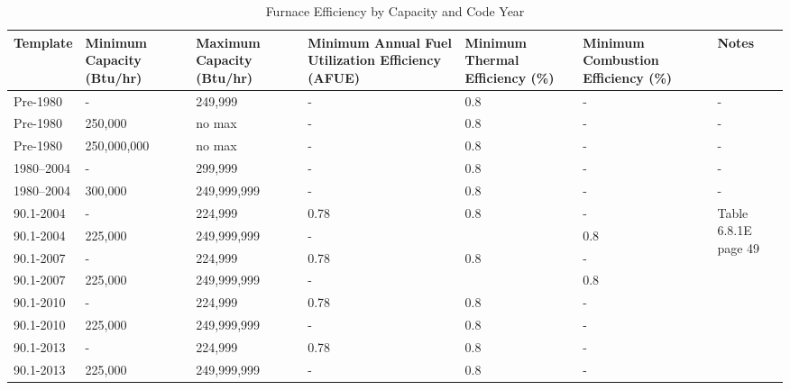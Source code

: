 \begin{table}
\centering
\scriptsize
\caption[Furnace Efficiency]{Furnace Efficiency by Capacity and Code Year}
\label{tab:furnace_eff_assignments}
\begin{tabular}{|p{0.5in}|p{0.5in}|p{0.5in}|p{0.5in}|p{0.5in}|p{0.5in}|p{1.5in}|}
\hline
\textbf{Template} &
  \textbf{Minimum   Capacity (Btu/hr)} &
  \textbf{Maximum   Capacity (Btu/hr)} &
  \textbf{Minimum   Annual Fuel Utilization Efficiency (AFUE)} &
  \textbf{Minimum   Thermal Efficiency (\%)} &
  \textbf{Minimum   Combustion Efficiency (\%)} &
  \textbf{Notes} \\ \hline
Pre-1980  & -           & 249,999       & -    & 0.8 & -   & -                                        \\ \hline
Pre-1980  & 250,000     & no max & -    & 0.8 & -   & -                                        \\ \hline
Pre-1980  & 250,000,000 & no max & -    & 0.8 & -   & -                                        \\ \hline
1980--2004 & -           & 299,999       & -    & 0.8 & -   & -                                        \\ \hline
1980--2004 & 300,000     & 249,999,999   & -    & 0.8 & -   & -                                        \\ \hline
90.1-2004           & -           & 224,999       & 0.78 & 0.8 & -   & \multirow{10}{*}{\parbox{2.5cm}{Table   6.8.1E page 49}} \\ \cline{1-6}
90.1-2004           & 225,000     & 249,999,999   & -    &     & 0.8 &                                          \\ \cline{1-6}
90.1-2007           & -           & 224,999       & 0.78 & 0.8 & -   &                                          \\ \cline{1-6}
90.1-2007           & 225,000     & 249,999,999   & -    &     & 0.8 &                                          \\ \cline{1-6}
90.1-2010           & -           & 224,999       & 0.78 & 0.8 & -   &                                          \\ \cline{1-6}
90.1-2010           & 225,000     & 249,999,999   & -    & 0.8 & -   &                                          \\ \cline{1-6}
90.1-2013           & -           & 224,999       & 0.78 & 0.8 & -   &                                          \\ \cline{1-6}
90.1-2013           & 225,000     & 249,999,999   & -    & 0.8 & -   &                                          \\ \cline{1-6}

\end{tabular}
\end{table}
